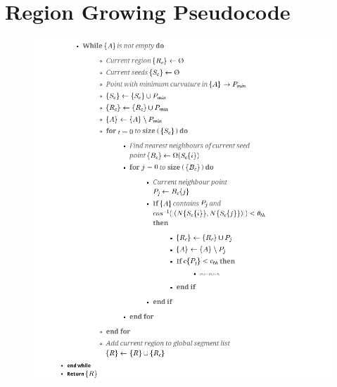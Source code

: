 \appendix
\chapter{Region Growing Pseudocode}

\begin{figure}[H]

\includegraphics[width=.9\linewidth]{Includes/images/RegionGrowingPseudocode}


\end{figure}
